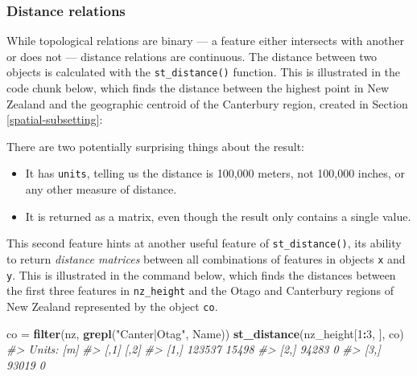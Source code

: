 \documentclass[]{krantz}
\newenvironment{Shaded}{\begin{snugshade}}{\end{snugshade}}
\newcommand{\CommentTok}[1]{\textcolor[rgb]{0.37,0.37,0.37}{\textit{#1}}}
\newcommand{\DataTypeTok}[1]{\textcolor[rgb]{0.27,0.27,0.27}{#1}}
\newcommand{\DecValTok}[1]{\textcolor[rgb]{0.06,0.06,0.06}{#1}}
\newcommand{\KeywordTok}[1]{\textcolor[rgb]{0.27,0.27,0.27}{\textbf{#1}}}
\newcommand{\NormalTok}[1]{#1}
\newcommand{\OperatorTok}[1]{\textcolor[rgb]{0.43,0.43,0.43}{\textbf{#1}}}
\newcommand{\StringTok}[1]{\textcolor[rgb]{0.5,0.5,0.5}{#1}}
\providecommand{\tightlist}{%
  \setlength{\itemsep}{0pt}\setlength{\parskip}{0pt}}
\begin{document}
\hypertarget{distance-relations}{%
\subsubsection{Distance relations}\label{distance-relations}}

While topological relations are binary --- a feature either intersects with another or does not --- distance relations are continuous.
The distance between two objects is calculated with the \texttt{st\_distance()} function.
This is illustrated in the code chunk below, which finds the distance between the highest point in New Zealand and the geographic centroid of the Canterbury region, created in Section \ref{spatial-subsetting}:

\begin{Shaded}
\end{Shaded}

There are two potentially surprising things about the result:

\begin{itemize}
\tightlist
\item
  It has \texttt{units}, telling us the distance is 100,000 meters, not 100,000 inches, or any other measure of distance.
\item
  It is returned as a matrix, even though the result only contains a single value.
\end{itemize}

This second feature hints at another useful feature of \texttt{st\_distance()}, its ability to return \emph{distance matrices} between all combinations of features in objects \texttt{x} and \texttt{y}.
This is illustrated in the command below, which finds the distances between the first three features in \texttt{nz\_height} and the Otago and Canterbury regions of New Zealand represented by the object \texttt{co}.

\begin{Shaded}
\begin{Highlighting}[]
\NormalTok{co =}\StringTok{ }\KeywordTok{filter}\NormalTok{(nz, }\KeywordTok{grepl}\NormalTok{(}\StringTok{"Canter|Otag"}\NormalTok{, Name))}
\KeywordTok{st_distance}\NormalTok{(nz_height[}\DecValTok{1}\OperatorTok{:}\DecValTok{3}\NormalTok{, ], co)}
\CommentTok{#> Units: [m]}
\CommentTok{#>        [,1]  [,2]}
\CommentTok{#> [1,] 123537 15498}
\CommentTok{#> [2,]  94283     0}
\CommentTok{#> [3,]  93019     0}
\end{Highlighting}
\end{Shaded}
\end{document}
